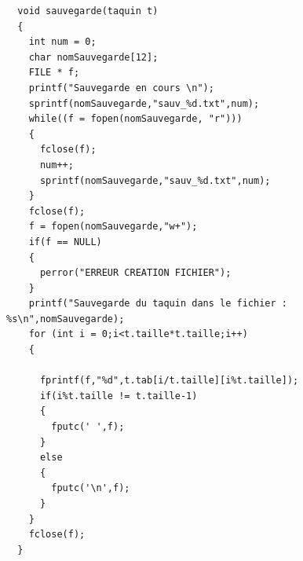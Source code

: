 \documentclass[12pt]{article}
\begin{document}
\begin{lstlisting}
  void sauvegarde(taquin t)
  {
    int num = 0;
    char nomSauvegarde[12];
    FILE * f;
    printf("Sauvegarde en cours \n");
    sprintf(nomSauvegarde,"sauv_%d.txt",num);
    while((f = fopen(nomSauvegarde, "r")))
    {
      fclose(f);
      num++;
      sprintf(nomSauvegarde,"sauv_%d.txt",num);
    }
    fclose(f);
    f = fopen(nomSauvegarde,"w+");
    if(f == NULL)
    {
      perror("ERREUR CREATION FICHIER");
    }
    printf("Sauvegarde du taquin dans le fichier : %s\n",nomSauvegarde);
    for (int i = 0;i<t.taille*t.taille;i++)
    {
      
      fprintf(f,"%d",t.tab[i/t.taille][i%t.taille]);
      if(i%t.taille != t.taille-1)
      {
        fputc(' ',f);
      }
      else
      {
        fputc('\n',f);
      }
    }
    fclose(f);
  }
\end{lstlisting}
\end{document}
